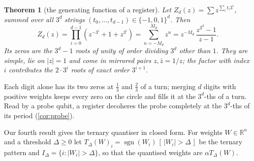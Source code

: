 \documentclass[11pt]{article}
\newtheorem{theorem}{Theorem}[section]
\theoremstyle{definition}\newtheorem{definition}[theorem]{Definition}
\theoremstyle{remark}\newtheorem{remark}[theorem]{Remark}
\newcommand{\R}{\mathbb R}\newcommand{\C}{\mathbb C}\newcommand{\N}{\mathbb N}
\newcommand{\sgn}{\operatorname{sgn}}
\begin{document}
\begin{theorem}[the generating function of a register]\label{prop:gf}
Let $Z_d(z)=\sum z^{\sum_it_i3^i}$, summed over all $3^d$ strings $(t_0,\dots,t_{d-1})\in\{-1,0,1\}^d$. Then
\[
Z_d(z)=\prod_{i=0}^{d-1}(z^{-3^i}+1+z^{3^i})=\sum_{n=-M_d}^{M_d}z^n=z^{-M_d}\,\frac{z^{3^d}-1}{z-1}.
\]
Its zeros are the $3^d-1$ roots of unity of order dividing $3^d$ other than $1$. They are simple, lie on $|z|=1$ and come in mirrored pairs $z,\bar z=1/z$; the factor with index $i$ contributes the $2\cdot3^i$ roots of exact order $3^{i+1}$.
\end{theorem}

Each digit alone has its two zeros at $\frac13$ and $\frac23$ of a turn; merging $d$ digits with positive weights keeps every zero on the circle and fills it at the $3^d$-ths of a turn. Read by a probe qubit, a register decoheres the probe completely at the $3^d$-ths of its period (\cref{cor:probe}).

Our fourth result gives the ternary quantiser in closed form. For weights $W\in\R^n$ and a threshold $\Delta\ge0$ let $T_\Delta(W)_i=\sgn(W_i)\,[\,|W_i|>\Delta\,]$ be the ternary pattern and $I_\Delta=\{i:|W_i|>\Delta\}$, so that the quantised weights are $\alpha T_\Delta(W)$.
\end{document}
